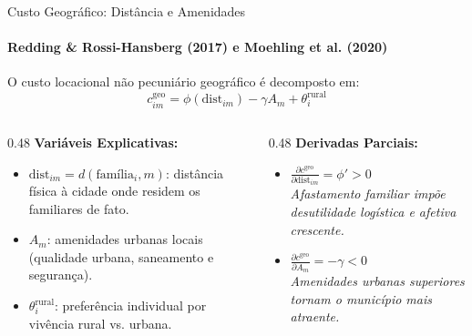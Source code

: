 \documentclass[aspectratio=169, 10pt]{beamer}
\begin{document}
\begin{frame}{Custo Geográfico: Distância e Amenidades}
  \framesubtitle{Redding \& Rossi-Hansberg (2017) e Moehling et al. (2020)}

  O custo locacional não pecuniário geográfico é decomposto em:
  \begin{equation}
    c^{\text{geo}}_{im} = \phi(\text{dist}_{im}) - \gamma A_m + \theta_i^{\text{rural}}
  \end{equation}

  \begin{columns}[T]
    \begin{column}{0.48\textwidth}
      \textbf{Variáveis Explicativas:}
      \begin{itemize}
        \item $\text{dist}_{im} = d(\text{família}_i, m)$: distância física à cidade onde residem os familiares de fato.
        \item $A_m$: amenidades urbanas locais (qualidade urbana, saneamento e segurança).
        \item $\theta_i^{\text{rural}}$: preferência individual por vivência rural vs. urbana.
      \end{itemize}
    \end{column}

    \begin{column}{0.48\textwidth}
      \textbf{Derivadas Parciais:}
      \begin{itemize}
        \item $\displaystyle \frac{\partial c^{\text{geo}}}{\partial \text{dist}_{im}} = \phi' > 0$ \\
        \emph{Afastamento familiar impõe desutilidade logística e afetiva crescente.}
        \item $\displaystyle \frac{\partial c^{\text{geo}}}{\partial A_m} = -\gamma < 0$ \\
        \emph{Amenidades urbanas superiores tornam o município mais atraente.}
      \end{itemize}
    \end{column}
  \end{columns}
\end{frame}
\end{document}
